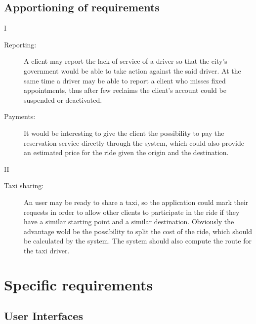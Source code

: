 \documentclass[9pt]{beamer}
\makeatletter
\newcommand*{\currentname}{\@currentlabelname}
\makeatother
\begin{document}
\subsection{Apportioning of requirements}
\begin{frame}{\currentname{} I}
\begin{description}
\item[Reporting:] A client may report the lack of service of a driver so that the city's government would be able to take action against the said driver. At the same time a driver may be able to report a client who misses fixed appointments, thus after few reclaims the client's account could be suspended or deactivated. 
\item[Payments:] It would be interesting to give the client the possibility to pay the reservation service directly through the system, which could also provide an estimated price for the ride given the origin and the destination.
\end{description}
\end{frame}
\begin{frame}{\currentname{} II}
\begin{description}
\item[Taxi sharing:] An user may be ready to share a taxi, so the application could mark their requests in order to allow other clients to participate in the ride if they have a similar starting point and a similar destination. Obviously the advantage wold be the possibility to split the cost of the ride, which should be calculated by the system. The system should also compute the route for the taxi driver.
\end{description}
\end{frame}

\section{Specific requirements}

\subsection{User Interfaces}
\end{document}
